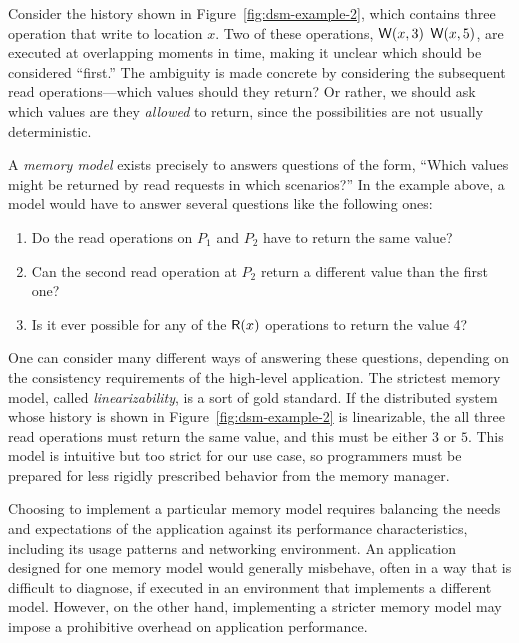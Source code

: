 \documentclass[]             %
{NASA}                       %
\theoremstyle{definition}
\newtheorem{example}[theorem]{Example}
\begin{document}

Consider the history shown in Figure~\ref{fig:dsm-example-2}, which
contains three operation that write to location $x$. Two of these
operations, $\mathsf{W}\!\left(x, 3\right)$ $\mathsf{W}\!\left(x, 5\right)$, are executed at
overlapping moments in time, making it unclear which should be
considered ``first.'' The ambiguity is made concrete by considering
the subsequent read operations---which values should they return? Or
rather, we should ask which values are they \emph{allowed} to return,
since the possibilities are not usually deterministic.

A \emph{memory model} exists precisely to answers questions of the
form, ``Which values might be returned by read requests in which
scenarios?'' In the example above, a model would have to answer
several questions like the following ones:
\begin{enumerate}
\item Do the read operations on $P_1$ and $P_2$ have to return the same value?
\item Can the second read operation at $P_2$ return a different value
  than the first one?
\item Is it ever possible for any of the $\mathsf{R}\!\left(x\right)$ operations to
  return the value 4?
\end{enumerate}

One can consider many different ways of answering these questions,
depending on the consistency requirements of the high-level
application. The strictest memory model, called
\emph{linearizability}, is a sort of gold standard. If the distributed
system whose history is shown in Figure~\ref{fig:dsm-example-2} is
linearizable, the all three read operations must return the same
value, and this must be either $3$ or $5$. This model is intuitive but
too strict for our use case, so programmers must be prepared for less
rigidly prescribed behavior from the memory manager.

Choosing to implement a particular memory model requires balancing the
needs and expectations of the application against its performance
characteristics, including its usage patterns and networking
environment. An application designed for one memory model would
generally misbehave, often in a way that is difficult to diagnose, if
executed in an environment that implements a different model. However,
on the other hand, implementing a stricter memory model may impose a
prohibitive overhead on application performance.
\end{document}
